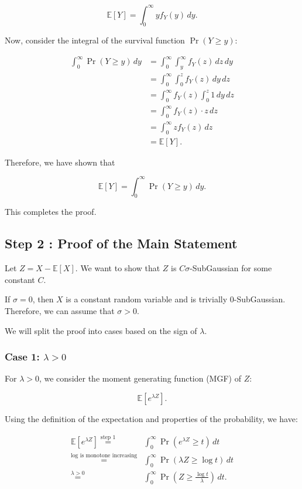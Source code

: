 \documentclass[a4 paper]{article}
\theoremstyle{boldStyle}
\theoremstyle{boldBlueStyle}
\theoremstyle{boldPurpleStyle}
\theoremstyle{boldRedStyle}
\begin{document}
\[
\mathbb{E}[Y] = \int_0^\infty y f_Y(y) \, dy.
\]

Now, consider the integral of the survival function \(\Pr(Y \geq y)\):

\begin{align*}
\int_0^\infty \Pr(Y \geq y) \, dy &= \int_0^\infty \int_y^\infty f_Y(z) \, dz \, dy \\
&= \int_0^\infty \int_0^z f_Y(z) \, dy \, dz \\
&= \int_0^\infty f_Y(z) \int_0^z 1 \, dy \, dz \\
&= \int_0^\infty f_Y(z) \cdot z \, dz \\
&= \int_0^\infty z f_Y(z) \, dz \\
&= \mathbb{E}[Y].
\end{align*}

Therefore, we have shown that

\[
\mathbb{E}[Y] = \int_0^\infty \Pr(Y \geq y) \, dy.
\]

This completes the proof.

\subsection*{Step 2 : Proof of the Main Statement}



Let \(Z = X - \mathbb{E}[X]\). We want to show that \(Z\) is \(C\sigma\)-SubGaussian for some constant \(C\). 

If $\sigma = 0$, then $X$ is a constant random variable and is trivially $0$-SubGaussian. Therefore, we can assume that $\sigma > 0$.

We will split the proof into cases based on the sign of \(\lambda\).

\subsubsection*{Case 1: \(\lambda > 0\)}


For \(\lambda > 0\), we consider the moment generating function (MGF) of \(Z\):

\[
\mathbb{E}[e^{\lambda Z}].
\]

Using the definition of the expectation and properties of the probability, we have:

\begin{align*}
\mathbb{E}[e^{\lambda Z}] \stackrel{\text{step 1}}{=} &\int_0^\infty \Pr(e^{\lambda Z} \geq t) \, dt \\
\stackrel{\text{log is monotone increasing}}{=} &\int_0^\infty \Pr(\lambda Z \geq \log t) \, dt \\
\stackrel{\lambda > 0}{=} &\int_0^\infty \Pr\left(Z \geq \frac{\log t}{\lambda}\right) \, dt.
\end{align*}
\end{document}
